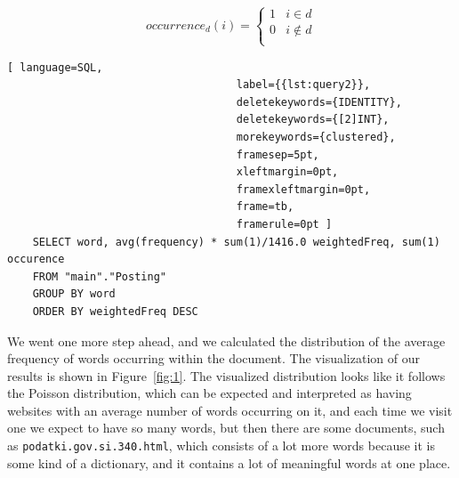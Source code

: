 \documentclass{article}
\begin{document}
	\begin{equation} \label{eq:2}
	occurrence_d(i)= \left\{
	\begin{array}{ll}
	1 & i \in d \\
	0 & i \not\in d\\
	\end{array} 
	\right. 
	\end{equation}
	
	\begin{lstlisting}[ language=SQL,
									label={{lst:query2}},
									deletekeywords={IDENTITY},
									deletekeywords={[2]INT},
									morekeywords={clustered},
									framesep=5pt,
									xleftmargin=0pt,
									framexleftmargin=0pt,
									frame=tb,
									framerule=0pt ]
	SELECT word, avg(frequency) * sum(1)/1416.0 weightedFreq, sum(1) occurence
	FROM "main"."Posting"
	GROUP BY word
	ORDER BY weightedFreq DESC
	\end{lstlisting}
	
	We went one more step ahead, and we calculated the distribution of the average frequency of words occurring within the document. The visualization of our results is shown in Figure~\ref{fig:1}. The visualized distribution looks like it follows the Poisson distribution, which can be expected and interpreted as having websites with an average number of words occurring on it, and each time we visit one we expect to have so many words, but then there are some documents, such as \texttt{podatki.gov.si.340.html}, which consists of a lot more words because it is some kind of a dictionary, and it contains a lot of meaningful words at one place.
	
	
\end{document}
